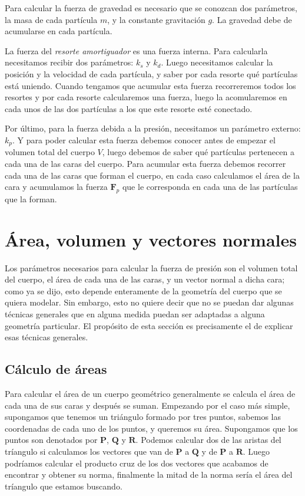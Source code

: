 Para calcular la fuerza de gravedad es necesario que se conozcan dos parámetros, la masa de cada partícula $m$, y la constante gravitación $g$.
La gravedad debe de acumularse en cada partícula.

La fuerza del \emph{resorte amortiguador} es una fuerza interna.
Para calcularla  necesitamos recibir dos parámetros: $k_s$ y $k_d$.
Luego necesitamos calcular la posición y la velocidad de cada partícula, y saber por cada resorte qué partículas está uniendo.
Cuando tengamos que acumular esta fuerza recorreremos todos los resortes y por cada resorte calcularemos una fuerza, luego la acomularemos en cada unos de las dos partículas a los que este resorte esté conectado.

Por último, para la fuerza debida a la presión, necesitamos un parámetro externo: $k_p$.
Y para poder calcular esta fuerza debemos conocer antes de empezar el volumen total del cuerpo $V$, luego debemos de saber qué partículas pertenecen a cada una de las caras del cuerpo.
Para acumular esta fuerza debemos recorrer cada una de las caras que forman el cuerpo, en cada caso calculamos el área de la cara y acumulamos la fuerza $\textbf{F}_p$ que le corresponda en cada una de las partículas que la forman.

\section{Área, volumen y vectores normales}
Los parámetros necesarios para calcular la fuerza de presión son el volumen total del cuerpo, el área de cada una de las caras, y un vector normal a dicha cara; como ya se dijo, esto depende enteramente de la geometría del cuerpo que se quiera modelar.
Sin embargo, esto no quiere decir que no se puedan dar algunas técnicas generales que en alguna medida puedan ser adaptadas a alguna geometría particular.
El propósito de esta sección es precisamente el de explicar esas técnicas generales.

\subsection{Cálculo de áreas}
Para calcular el área de un cuerpo geométrico generalmente se calcula el área de cada una de sus caras y después se suman.
Empezando por el caso más simple, supongamos que tenemos un triángulo formado por tres puntos, sabemos las coordenadas de cada uno de los puntos, y queremos su área.
Supongamos que los puntos son denotados por $\textbf{P}$, $\textbf{Q}$ y $\textbf{R}$.
Podemos calcular dos de las aristas del tríangulo si calculamos los vectores que van de $\textbf{P}$ a $\textbf{Q}$ y de $\textbf{P}$ a $\textbf{R}$.
Luego podríamos calcular el producto cruz de los dos vectores que acabamos de encontrar y obtener su norma, finalmente la mitad de la norma sería el área del tríangulo que estamos buscando.

